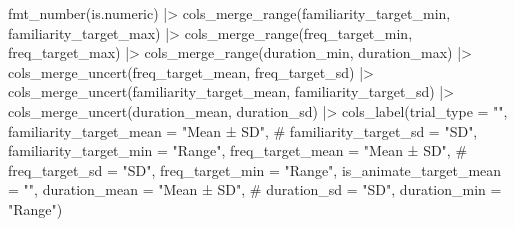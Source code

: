 \documentclass[
  letterpaper,
  DIV=11,
  numbers=noendperiod]{scrartcl}
\newenvironment{Shaded}{\begin{snugshade}}{\end{snugshade}}
\newcommand{\AttributeTok}[1]{\textcolor[rgb]{0.40,0.45,0.13}{#1}}
\newcommand{\CommentTok}[1]{\textcolor[rgb]{0.37,0.37,0.37}{#1}}
\newcommand{\FunctionTok}[1]{\textcolor[rgb]{0.28,0.35,0.67}{#1}}
\newcommand{\NormalTok}[1]{\textcolor[rgb]{0.00,0.23,0.31}{#1}}
\newcommand{\SpecialCharTok}[1]{\textcolor[rgb]{0.37,0.37,0.37}{#1}}
\newcommand{\StringTok}[1]{\textcolor[rgb]{0.13,0.47,0.30}{#1}}
\begin{document}
\begin{Shaded}
\begin{Highlighting}[]
    \FunctionTok{fmt\_number}\NormalTok{(is.numeric) }\SpecialCharTok{|\textgreater{}} 
    \FunctionTok{cols\_merge\_range}\NormalTok{(familiarity\_target\_min, familiarity\_target\_max) }\SpecialCharTok{|\textgreater{}} 
    \FunctionTok{cols\_merge\_range}\NormalTok{(freq\_target\_min, freq\_target\_max) }\SpecialCharTok{|\textgreater{}} 
    \FunctionTok{cols\_merge\_range}\NormalTok{(duration\_min, duration\_max) }\SpecialCharTok{|\textgreater{}}
    \FunctionTok{cols\_merge\_uncert}\NormalTok{(freq\_target\_mean, freq\_target\_sd) }\SpecialCharTok{|\textgreater{}} 
    \FunctionTok{cols\_merge\_uncert}\NormalTok{(familiarity\_target\_mean, familiarity\_target\_sd) }\SpecialCharTok{|\textgreater{}} 
    \FunctionTok{cols\_merge\_uncert}\NormalTok{(duration\_mean, duration\_sd) }\SpecialCharTok{|\textgreater{}} 
    \FunctionTok{cols\_label}\NormalTok{(}\AttributeTok{trial\_type =} \StringTok{""}\NormalTok{,}
               \AttributeTok{familiarity\_target\_mean =} \StringTok{"Mean ± SD"}\NormalTok{,}
               \CommentTok{\# familiarity\_target\_sd = "SD",}
               \AttributeTok{familiarity\_target\_min =} \StringTok{"Range"}\NormalTok{,}
               \AttributeTok{freq\_target\_mean =} \StringTok{"Mean ± SD"}\NormalTok{,}
               \CommentTok{\# freq\_target\_sd = "SD",}
               \AttributeTok{freq\_target\_min =} \StringTok{"Range"}\NormalTok{,}
               \AttributeTok{is\_animate\_target\_mean =} \StringTok{""}\NormalTok{,}
               \AttributeTok{duration\_mean =} \StringTok{"Mean ± SD"}\NormalTok{,}
               \CommentTok{\# duration\_sd = "SD",}
               \AttributeTok{duration\_min =} \StringTok{"Range"}\NormalTok{) }
\end{Highlighting}
\end{Shaded}
\end{document}
